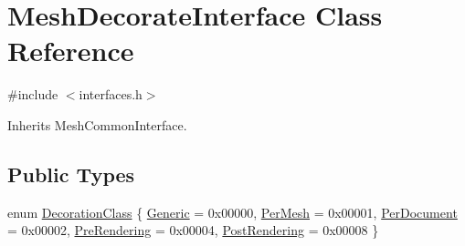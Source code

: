\hypertarget{class_mesh_decorate_interface}{}\section{Mesh\+Decorate\+Interface Class Reference}
\label{class_mesh_decorate_interface}


{\ttfamily \#include $<$interfaces.\+h$>$}



Inherits Mesh\+Common\+Interface.

\subsection*{Public Types}
\begin{DoxyCompactItemize}
\item 
enum \hyperlink{class_mesh_decorate_interface_ab781fd76c42ba9249b36b7eb16e10ed7}{Decoration\+Class} \{ \newline
\hyperlink{class_mesh_decorate_interface_ab781fd76c42ba9249b36b7eb16e10ed7a390d37beb0873ae56620e64b90954872}{Generic} = 0x00000, 
\hyperlink{class_mesh_decorate_interface_ab781fd76c42ba9249b36b7eb16e10ed7a355b0828bd4c9505a4482615d601053b}{Per\+Mesh} = 0x00001, 
\hyperlink{class_mesh_decorate_interface_ab781fd76c42ba9249b36b7eb16e10ed7aea165dcb1f734e15584b4c8e4bc15a46}{Per\+Document} = 0x00002, 
\hyperlink{class_mesh_decorate_interface_ab781fd76c42ba9249b36b7eb16e10ed7a979224ae674a957f93bc1b13c861c04e}{Pre\+Rendering} = 0x00004, 
\newline
\hyperlink{class_mesh_decorate_interface_ab781fd76c42ba9249b36b7eb16e10ed7a1e5666dea1d697cf38e0175d65876780}{Post\+Rendering} = 0x00008
 \}
\end{DoxyCompactItemize}

